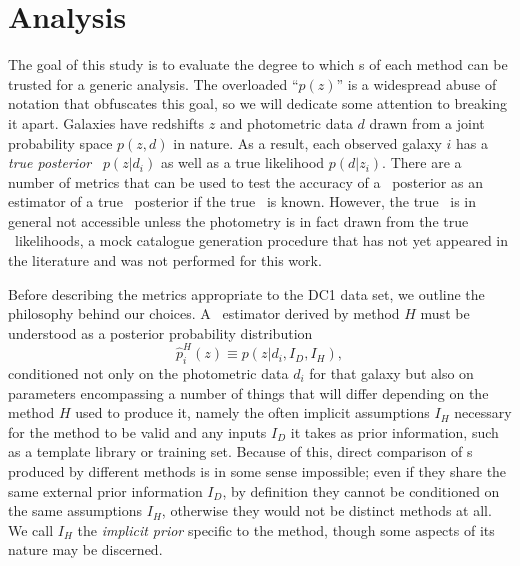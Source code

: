 \section{Analysis}

The goal of this study is to evaluate the degree to which \pzpdf s of each method can be trusted for a generic analysis.
The overloaded ``$p(z)$'' is a widespread abuse of notation that obfuscates this goal, so we will dedicate some attention to breaking it apart.
Galaxies have redshifts $z$ and photometric data $d$ drawn from a joint probability space $p(z, d)$ in nature.
As a result, each observed galaxy $i$ has a \textit{true posterior \pzpdf}\ $p(z \vert d_{i})$ as well as a true likelihood $p(d \vert z_{i})$.
There are a number of metrics that can be used to test the accuracy of a \pz\ posterior as an estimator of a true \pz\ posterior if the true \pzpdf\ is known.
However, the true \pzpdf\ is in general not accessible unless the photometry is in fact drawn from the true \pz\ likelihoods, a mock catalogue generation procedure that has not yet appeared in the literature and was not performed for this work.

Before describing the metrics appropriate to the DC1 data set, we outline the philosophy behind our choices.
A \pzpdf\ estimator derived by method $H$ must be understood as a posterior probability distribution
\begin{equation}
\label{eq:pzpdf}
\hat{p}^{H}_{i}(z) \equiv p(z \vert d_{i}, I_{D}, I_{H}),
\end{equation}
conditioned not only on the photometric data $d_{i}$ for that galaxy but also on parameters encompassing a number of things that will differ depending on the method $H$ used to produce it, namely the often implicit assumptions $I_{H}$ necessary for the method to be valid and any inputs $I_{D}$ it takes as prior information, such as a template library or training set.
Because of this, direct comparison of \pzpdf s produced by different methods is in some sense impossible; even if they share the same external prior information $I_{D}$, by definition they cannot be conditioned on the same assumptions $I_{H}$, otherwise they would not be distinct methods at all.
We call $I_{H}$ the \textit{implicit prior} specific to the method, though some aspects of its nature may be discerned.

